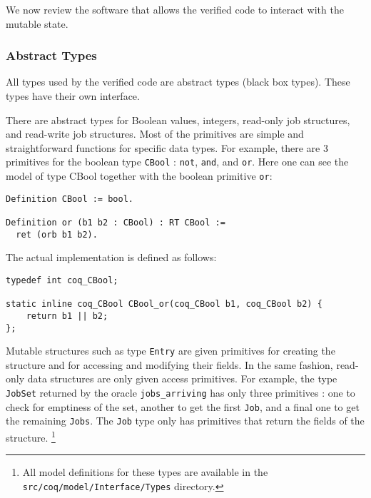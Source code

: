 	We now review the software that allows the verified code to interact with the mutable state.

	\subsubsection{Abstract Types}

	All types used by the verified code are abstract types (black box types). These types have their own interface. 

	There are abstract types for Boolean values, integers, read-only job structures, and read-write job structures. Most of the primitives are simple and straightforward functions for specific data types. For example, there are 3 primitives for the boolean type \texttt{CBool} : \texttt{not}, \texttt{and}, and \texttt{or}.
	Here one can see the model of type CBool together with the boolean primitive \texttt{or}:

	\begin{verbatim}
Definition CBool := bool.

Definition or (b1 b2 : CBool) : RT CBool :=
  ret (orb b1 b2).
	\end{verbatim}

	The actual implementation is defined as follows:

	\begin{verbatim}
typedef int coq_CBool;

static inline coq_CBool CBool_or(coq_CBool b1, coq_CBool b2) {
    return b1 || b2;
};
	\end{verbatim}

	Mutable structures such as type \texttt{Entry} are given primitives for creating the structure and for accessing and modifying their fields. In the same fashion, read-only data structures are only given access primitives. For example, the type \texttt{JobSet} returned by the oracle \texttt{jobs\_arriving} has only three primitives : one to check for emptiness of the set, another to get the first \texttt{Job}, and a final one to get the remaining \texttt{Jobs}. The \texttt{Job} type only has primitives that return the fields of the structure. \footnote{All model definitions for these types are available in the \texttt{src/coq/model/Interface/Types} directory.}



